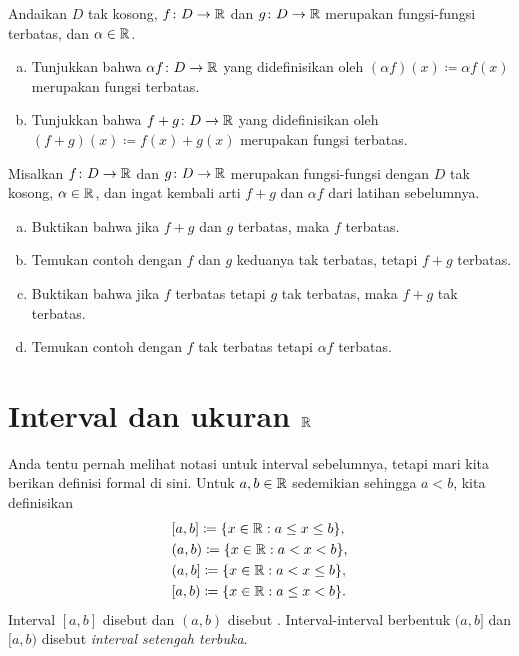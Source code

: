 \begin{exercise}
\pagebreak[2]
Andaikan $D$ tak kosong, $f \colon D \to {\mathbb{R}}$ dan $g \colon D \to {\mathbb{R}}$ merupakan
fungsi-fungsi terbatas, dan
$\alpha \in {\mathbb{R}}$.
\begin{enumerate}[a)]
\item
Tunjukkan bahwa $\alpha f \colon D \to {\mathbb{R}}$ yang didefinisikan oleh $(\alpha f) (x) \coloneqq \alpha
f(x)$ merupakan fungsi terbatas.
\item
Tunjukkan bahwa $f+g \colon D \to {\mathbb{R}}$ yang didefinisikan oleh $(f+g) (x) \coloneqq f(x) + g(x)$
merupakan fungsi terbatas.
\end{enumerate}
\end{exercise}

\begin{exercise}
Misalkan $f \colon D \to {\mathbb{R}}$ dan $g \colon D \to {\mathbb{R}}$ merupakan fungsi-fungsi dengan $D$
tak kosong, $\alpha \in {\mathbb{R}}$, dan
ingat kembali arti $f+g$ dan $\alpha f$ dari latihan sebelumnya.
\begin{enumerate}[a)]
\item
Buktikan bahwa jika $f+g$ dan $g$ terbatas, maka $f$ terbatas.
\item
Temukan contoh dengan $f$ dan $g$ keduanya tak terbatas, tetapi $f+g$
terbatas.
\item
Buktikan bahwa jika $f$ terbatas tetapi $g$ tak terbatas, maka $f+g$
tak terbatas.
\item
Temukan contoh dengan $f$ tak terbatas tetapi $\alpha f$ terbatas.
\end{enumerate}
\end{exercise}


\sectionnewpage
\section{Interval dan ukuran \texorpdfstring{${\mathbb{R}}$}{R}}
\label{sec:intandsizeR}


Anda tentu pernah melihat notasi untuk interval
sebelumnya, tetapi mari kita berikan definisi
formal di sini.  Untuk $a, b \in {\mathbb{R}}$ sedemikian sehingga $a < b$, kita definisikan
%
%
%
%
%
\begin{align*}
& [a,b] \coloneqq \{ x \in {\mathbb{R}} : a \leq x \leq b \}, \\
& (a,b) \coloneqq \{ x \in {\mathbb{R}} : a < x < b \}, \\
& (a,b] \coloneqq \{ x \in {\mathbb{R}} : a < x \leq b \}, \\
& [a,b) \coloneqq \{ x \in {\mathbb{R}} : a \leq x < b \} .
\end{align*}
Interval $[a,b]$ disebut \emph{}
dan $(a,b)$ disebut \emph{}.  Interval-interval
berbentuk $(a,b]$ dan $[a,b)$ disebut
\emph{interval setengah terbuka}.


